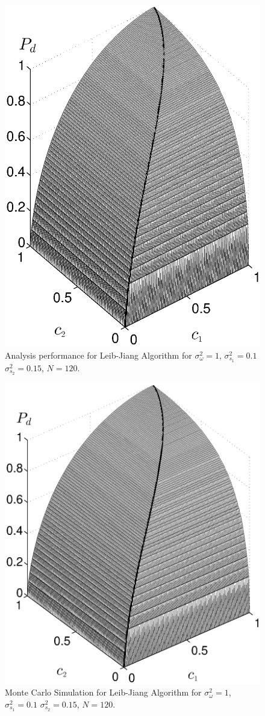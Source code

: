 \documentclass[12pt,journal,a4paper,twoside,onecolumn,draft]{IEEEtran}
\begin{document}
\begin{spacing}{2.5}
\begin{figure}[!t]
\centering
\includegraphics[width=12cm]{simu_chi2ROC.eps}
\caption{Analysis performance for Leib-Jiang Algorithm for $\sigma_\omega^2=1$, $\sigma_{s_1}^2=0.1$ $\sigma_{s_2}^2 = 0.15$, $N=120$.}
\label{317}
\end{figure}

\begin{figure}[!t]
\centering
\includegraphics[width=12cm]{simu_c.eps}
\caption{Monte Carlo Simulation for Leib-Jiang Algorithm for $\sigma_\omega^2=1$, $\sigma_{s_1}^2=0.1$ $\sigma_{s_2}^2 = 0.15$, $N=120$.}
\label{pic: simulation result}
\end{figure}

\end{spacing}
\end{document}
